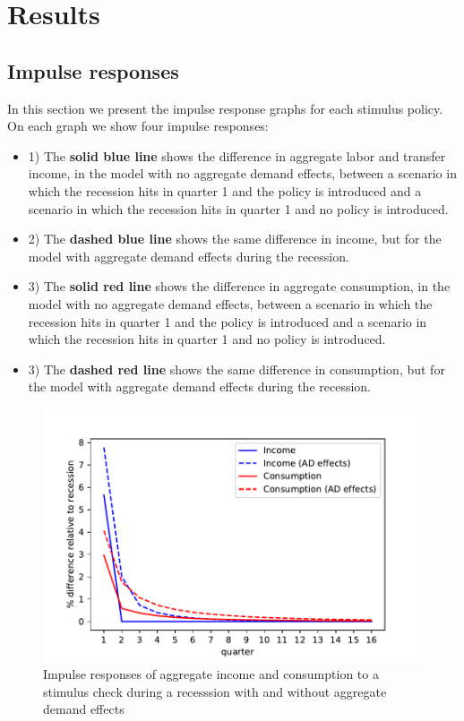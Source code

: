 \documentclass[../HAFiscal]{subfiles}
\begin{document}
\section{Results}


\subsection{Impulse responses}
In this section we present the impulse response graphs for each stimulus policy. On each graph we show four impulse responses:
\begin{itemize}
	\item 1) The \textbf{solid blue line} shows the difference in aggregate labor and transfer income, in the model with no aggregate demand effects, between a scenario in which the recession hits in quarter 1 and the policy is introduced and a scenario in which the recession hits in quarter 1 and no policy is introduced.
	\item 2) The \textbf{dashed blue line} shows the same difference in income, but for the model with aggregate demand effects during the recession.
	\item 3) The \textbf{solid red line} shows the difference in aggregate consumption, in the model with no aggregate demand effects, between a scenario in which the recession hits in quarter 1 and the policy is introduced and a scenario in which the recession hits in quarter 1 and no policy is introduced.
	\item 3) The \textbf{dashed red line} shows the same difference in consumption, but for the model with aggregate demand effects during the recession.
\end{itemize}

\begin{figure}
	\centering
	\includegraphics[width=0.8\linewidth]{Code/HA-Models/FromPandemicCode/Figures/recession_Check_relrecession}
	\caption{Impulse responses of aggregate income and consumption to a stimulus check during a recesssion with and without aggregate demand effects}
	\label{fig:recessioncheckrelrecession}
\end{figure}
\end{document}
